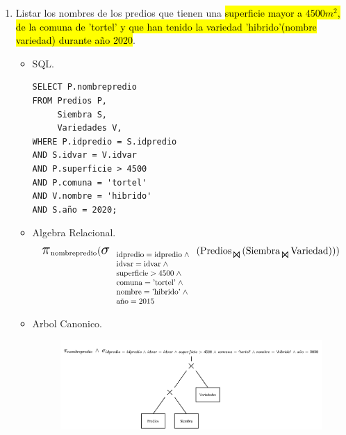 \documentclass{templateNote}
\newcommand{\hlcolor}[2]{{\sethlcolor{#1}\hl{#2}}}
\begin{document}
\begin{enumerate}
    \newpage
    \item Listar los nombres de los predios que tienen una \hlcolor{Salmon!40}{superficie mayor a $4500m^2$, de la comuna de 'tortel' y que han tenido la variedad 'hibrido'(nombre variedad) durante a\~no 2020}.
    \begin{itemize}
        \item SQL.
        \begin{verbatim}
SELECT P.nombrepredio
FROM Predios P,
     Siembra S,
     Variedades V,
WHERE P.idpredio = S.idpredio 
AND S.idvar = V.idvar 
AND P.superficie > 4500
AND P.comuna = 'tortel'
AND V.nombre = 'hibrido'
AND S.año = 2020;
        \end{verbatim}

        \item Algebra Relacional.
        \begin{align*}
            \scalebox{1.5}{$\pi$}_{\text{nombrepredio}} (
                \scalebox{1.5}{$\sigma$}_{
                    \scalebox{0.8}{
                        $\begin{array}{l}
                            \text{idpredio} = \text{idpredio} \; \wedge \\
                            \text{idvar} = \text{idvar} \; \wedge \\
                            \text{superficie} > 4500 \; \wedge \\
                            \text{comuna} = \text{'tortel'} \; \wedge \\
                            \text{nombre} = \text{'hibrido'} \; \wedge \\
                            \text{a\~no} = 2015
                        \end{array}$
                    }
                } (
                    \text{Predios}_{\scalebox{1.3}{$\Join$}} (
                        \text{Siembra}_{\scalebox{1.3}{$\Join$}} \text{Variedad}
                    )
                )
            )
        \end{align*}
        
        \newpage
        \item Arbol Canonico.
        \begin{figure}[H]
            \centering
            \includegraphics[width=\textwidth]{img/E2-Canonico.png}
        \end{figure}


\end{itemize}
\end{enumerate}
\end{document}
